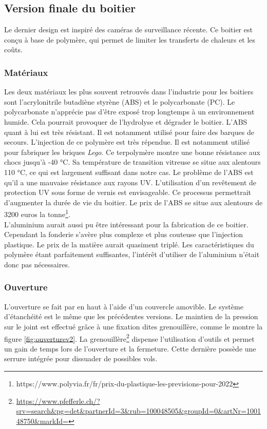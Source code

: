 \subsection{Version finale du boitier}

Le dernier design est inspiré des caméras de surveillance récente. Ce boitier est conçu à base de 
polymère, qui permet de limiter les transferts de chaleurs et les coûts.

\subsubsection{Matériaux}

Les deux matériaux les plus souvent retrouvés dans l’industrie pour les boitiers sont l’acrylonitrile 
butadiène styrène (ABS) et le polycarbonate (PC). Le polycarbonate n’apprécie pas d’être exposé trop 
longtemps à un environnement humide. Cela pourrait provoquer de l’hydrolyse et dégrader le boitier. 
L’ABS quant à lui est très résistant. Il est notamment utilisé pour faire des barques de secours.  
L’injection de ce polymère est très répendue. Il est notamment utilisé pour fabriquer les briques \emph{Lego}. 
Ce terpolymère montre une bonne résistance aux chocs jusqu'à -40 °C. Sa température de transition vitreuse se 
situe aux alentours 110 °C, ce qui est largement suffisant dans notre cas. Le problème de l’ABS est qu’il a une mauvaise 
résistance aux rayons UV. L’utilisation d’un revêtement de protection UV sous forme de vernis est envisageable. 
Ce processus permettrait d’augmenter la durée de vie du boitier. Le prix de l’ABS se situe aux alentours 
de 3200 euros la tonne\footnote{https://www.polyvia.fr/fr/prix-du-plastique-les-previsions-pour-2022}.\\
L’aluminium aurait aussi pu être intéressant pour la fabrication de ce boitier. Cependant la fonderie 
s’avère plus complexe et plus couteuse que l’injection plastique. Le prix de la matière aurait quasiment 
triplé. Les caractéristiques du polymère étant parfaitement suffisantes, l’intérêt d’utiliser de l’aluminium 
n’était donc pas nécessaires.

\subsubsection{Ouverture}

L’ouverture se fait par en haut à l’aide d’un couvercle amovible. Le système d’étanchéité est le 
même que les précédentes versions. Le maintien de la pression sur le joint est effectué grâce à 
une fixation dites grenouillère, comme le montre la figure \ref{fig:ouverturev2}. 
La grenouillère\footnote{\url{https://www.pfefferle.ch/?srv=search&pg=det&partnerId=3&rub=100048505&groupId=0&artNr=100148750&markId=}} 
dispense l’utilisation d’outils et permet un gain de temps lors de l’ouverture et la fermeture. 
Cette dernière possède une serrure intégrée pour dissuader de possibles vols.


